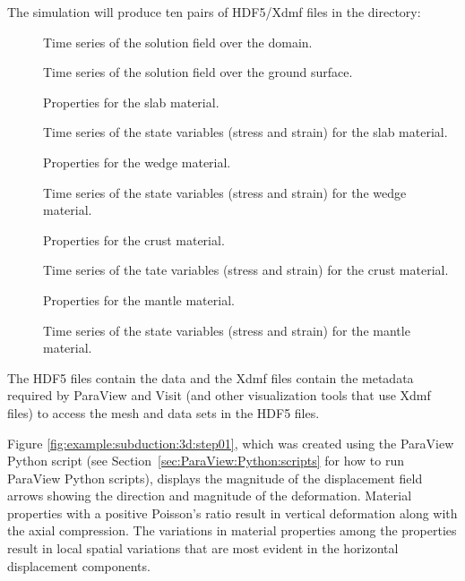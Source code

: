 The simulation will produce ten pairs of HDF5/Xdmf files in the
 directory:
\begin{description}
\item[] Time series of the solution field over the domain.
\item[] Time series of the solution field over the ground surface.
\item[] Properties for
  the slab material.
\item[] Time series of the state variables (stress and strain) for the slab material.
\item[] Properties for
  the wedge material.
\item[] Time series of the state variables (stress and strain) for the wedge material.
\item[] Properties for
  the crust material.
\item[] Time series of the tate variables
  (stress and strain) for the crust material.
\item[] Properties for
  the mantle material.
\item[] Time series of the state variables
  (stress and strain) for the mantle material.
\end{description}
The HDF5 files contain the data and the Xdmf files contain the
metadata required by ParaView and Visit (and other visualization tools
that use Xdmf files) to access the mesh and data sets in the HDF5
files.

Figure \ref{fig:example:subduction:3d:step01}, which was created using
the ParaView Python script  (see
Section~\vref{sec:ParaView:Python:scripts} for how to run ParaView
Python scripts), displays the magnitude of
the displacement field arrows showing the direction and magnitude of
the deformation. Material properties with a positive Poisson's ratio
result in vertical deformation along with the axial compression. The
variations in material properties among the properties result in local
spatial variations that are most evident in the horizontal
displacement components.

